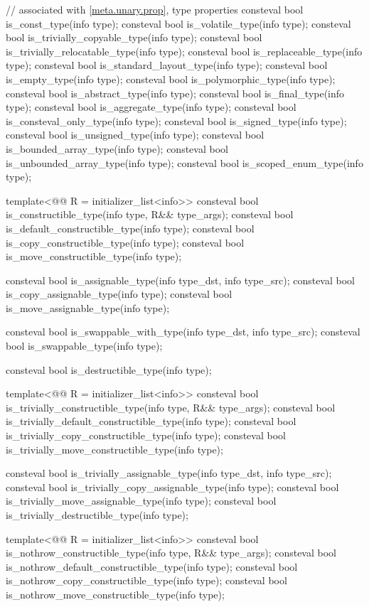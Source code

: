 \begin{codeblock}
{  // associated with \ref{meta.unary.prop}, type properties
  consteval bool is_const_type(info type);
  consteval bool is_volatile_type(info type);
  consteval bool is_trivially_copyable_type(info type);
  consteval bool is_trivially_relocatable_type(info type);
  consteval bool is_replaceable_type(info type);
  consteval bool is_standard_layout_type(info type);
  consteval bool is_empty_type(info type);
  consteval bool is_polymorphic_type(info type);
  consteval bool is_abstract_type(info type);
  consteval bool is_final_type(info type);
  consteval bool is_aggregate_type(info type);
  consteval bool is_consteval_only_type(info type);
  consteval bool is_signed_type(info type);
  consteval bool is_unsigned_type(info type);
  consteval bool is_bounded_array_type(info type);
  consteval bool is_unbounded_array_type(info type);
  consteval bool is_scoped_enum_type(info type);

  template<@@ R = initializer_list<info>>
    consteval bool is_constructible_type(info type, R&& type_args);
  consteval bool is_default_constructible_type(info type);
  consteval bool is_copy_constructible_type(info type);
  consteval bool is_move_constructible_type(info type);

  consteval bool is_assignable_type(info type_dst, info type_src);
  consteval bool is_copy_assignable_type(info type);
  consteval bool is_move_assignable_type(info type);

  consteval bool is_swappable_with_type(info type_dst, info type_src);
  consteval bool is_swappable_type(info type);

  consteval bool is_destructible_type(info type);

  template<@@ R = initializer_list<info>>
    consteval bool is_trivially_constructible_type(info type, R&& type_args);
  consteval bool is_trivially_default_constructible_type(info type);
  consteval bool is_trivially_copy_constructible_type(info type);
  consteval bool is_trivially_move_constructible_type(info type);

  consteval bool is_trivially_assignable_type(info type_dst, info type_src);
  consteval bool is_trivially_copy_assignable_type(info type);
  consteval bool is_trivially_move_assignable_type(info type);
  consteval bool is_trivially_destructible_type(info type);

  template<@@ R = initializer_list<info>>
    consteval bool is_nothrow_constructible_type(info type, R&& type_args);
  consteval bool is_nothrow_default_constructible_type(info type);
  consteval bool is_nothrow_copy_constructible_type(info type);
  consteval bool is_nothrow_move_constructible_type(info type);

}
\end{codeblock}
